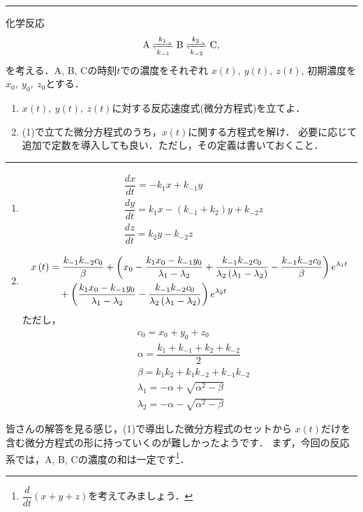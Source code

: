 \documentclass[11pt,a4]{jsarticle}
\numberwithin{equation}{section}
\begin{document}
%
\newpage
\hrule
\enshu
化学反応
\begin{align*}
 \ce{A  <=>[k_1][k_{-1}] B <=>[k_2][k_{-2}] C}, 
\end{align*}
を考える．A, B, Cの時刻$t$での濃度をそれぞれ
$x\left(t\right),~y\left(t\right),~z\left(t\right)$,
初期濃度を$x_0,~y_0,~z_0$とする．
\begin{enumerate}[(1)]
  \item $x(t),~y(t),~z(t)$に対する反応速度式(微分方程式)を立てよ．
  \item (1)で立てた微分方程式のうち，$x(t)$に関する方程式を解け．
	必要に応じて追加で定数を導入しても良い．ただし，その定義は書いておくこと．
\end{enumerate}
%
\hrule
%
\begin{enumerate}[(1)]
  \item 
\begin{align*}
  & \dfrac{dx}{dt} = -k_1 x + k_{-1} y\\
  & \dfrac{dy}{dt} = k_1 x -(k_{-1}+k_2)y + k_{-2}z\\
  & \dfrac{dz}{dt} = k_2 y - k_{-2}z
\end{align*} 
%
  \item
\begin{align*}
 x\left(t\right) & =\dfrac{k_{-1}k_{-2}c_{0}}{\beta}+\left(x_{0}-\dfrac{k_{1}x_{0}-k_{-1}y_{0}}{\lambda_{1}-\lambda_{2}}+\dfrac{k_{-1}k_{-2}c_{0}}{\lambda_{2}\left(\lambda_{1}-\lambda_{2}\right)}-\dfrac{k_{-1}k_{-2}c_{0}}{\beta}\right)e^{\lambda_{1}t} \notag \\
&\quad +\left(\dfrac{k_{1}x_{0}-k_{-1}y_{0}}{\lambda_{1}-\lambda_{2}}-\dfrac{k_{-1}k_{-2}c_{0}}{\lambda_{2}\left(\lambda_{1}-\lambda_{2}\right)}\right)e^{\lambda_{2}t}
\end{align*}
ただし，
\begin{align*}
  & c_0 = x_0 + y_0 + z_0 \\
  & \alpha = \dfrac{k_1 + k_{-1} + k_{2} + k_{-2}}{2} \\
  & \beta  = k_{1}k_{2}+k_{1}k_{-2}+k_{-1}k_{-2} \\
  & \lambda_{1}  =-\alpha+\sqrt{\alpha^{2}-\beta} \\
  & \lambda_{2}=-\alpha-\sqrt{\alpha^{2}-\beta}
\end{align*}
\end{enumerate}
%
皆さんの解答を見る感じ，(1)で導出した微分方程式のセットから
$x(t)$だけを含む微分方程式の形に持っていくのが難しかったようです．
まず，今回の反応系では，A, B, Cの濃度の和は一定です\footnote{$\dfrac{d}{dt}(x+y+z)$を考えてみましょう．}．
\end{document}
